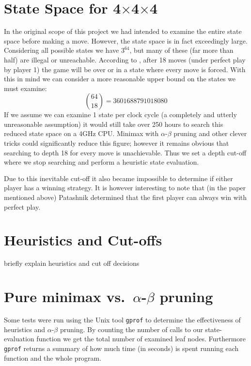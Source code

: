\documentclass[10pt,twocolumn]{article}
\begin{document}
\section{State Space for 4$\times$4$\times$4}
In the original scope of this project we had intended to examine the entire state space
before making a move. However, the state space is in fact exceedingly large. Considering all
possible states we have $3^{64}$, but many of these (far more than half) are illegal or unreachable.
According to \cite{Patashnik1980}, after 18 moves (under perfect play by player 1)
the game will be over or in a state where every move is forced. With this in mind we can 
consider a more reasonable upper bound on the states we must examine:
 \[\binom{64}{18} = 3601688791018080\]
If we assume we can examine 1 state per clock cycle (a completely and utterly unreasonable assumption) it would
still take over 250 hours to search this reduced state space on a 4GHz CPU. Minimax with $\alpha$-$\beta$ pruning
and other clever tricks could significantly reduce this figure; however it remains obvious that
searching to depth 18 for every move is unachievable. Thus we set a depth cut-off where we stop
searching and perform a heuristic state evaluation.

Due to this inevitable cut-off it also became impossible to determine if either
player has a winning strategy. It is however interesting to note that (in the paper
mentioned above) Patashnik determined that the first player can always win with perfect play. 

\section{Heuristics and Cut-offs}
briefly explain heuristics and cut off decisions



\section{Pure minimax vs.\ $\alpha$-$\beta$ pruning}
Some tests were run using the Unix tool \texttt{gprof} to determine the effectiveness
of heuristics and $\alpha$-$\beta$ pruning. By counting the number of calls
to our state-evaluation function we get the total number of examined leaf nodes.
Furthermore \texttt{gprof} returns a summary of how much time (in seconds) is spent running
each function and the whole program.
\end{document}
